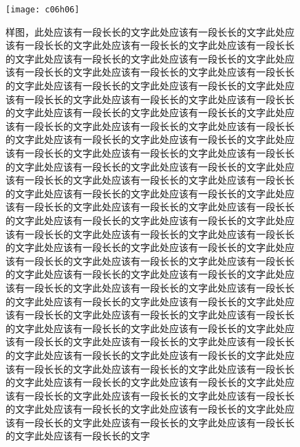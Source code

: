 {\begin{figure}[!htbp]
    \centering
    \texttt{[image: c06h06]}
    \caption{样图，此处应该有一段长长的文字此处应该有一段长长的文字此处应该有一段长长的文字此处应该有一段长长的文字此处应该有一段长长的文字此处应该有一段长长的文字此处应该有一段长长的文字此处应该有一段长长的文字此处应该有一段长长的文字此处应该有一段长长的文字此处应该有一段长长的文字此处应该有一段长长的文字此处应该有一段长长的文字此处应该有一段长长的文字此处应该有一段长长的文字此处应该有一段长长的文字此处应该有一段长长的文字此处应该有一段长长的文字此处应该有一段长长的文字此处应该有一段长长的文字此处应该有一段长长的文字此处应该有一段长长的文字此处应该有一段长长的文字此处应该有一段长长的文字此处应该有一段长长的文字此处应该有一段长长的文字此处应该有一段长长的文字此处应该有一段长长的文字此处应该有一段长长的文字此处应该有一段长长的文字此处应该有一段长长的文字此处应该有一段长长的文字此处应该有一段长长的文字此处应该有一段长长的文字此处应该有一段长长的文字此处应该有一段长长的文字此处应该有一段长长的文字此处应该有一段长长的文字此处应该有一段长长的文字此处应该有一段长长的文字此处应该有一段长长的文字此处应该有一段长长的文字此处应该有一段长长的文字此处应该有一段长长的文字此处应该有一段长长的文字此处应该有一段长长的文字此处应该有一段长长的文字此处应该有一段长长的文字此处应该有一段长长的文字此处应该有一段长长的文字此处应该有一段长长的文字此处应该有一段长长的文字此处应该有一段长长的文字此处应该有一段长长的文字此处应该有一段长长的文字此处应该有一段长长的文字此处应该有一段长长的文字此处应该有一段长长的文字此处应该有一段长长的文字此处应该有一段长长的文字此处应该有一段长长的文字此处应该有一段长长的文字此处应该有一段长长的文字此处应该有一段长长的文字此处应该有一段长长的文字此处应该有一段长长的文字此处应该有一段长长的文字此处应该有一段长长的文字此处应该有一段长长的文字此处应该有一段长长的文字此处应该有一段长长的文字此处应该有一段长长的文字此处应该有一段长长的文字此处应该有一段长长的文字此处应该有一段长长的文字此处应该有一段长长的文字}%
    \label{fig:c06h}
\end{figure}

}

